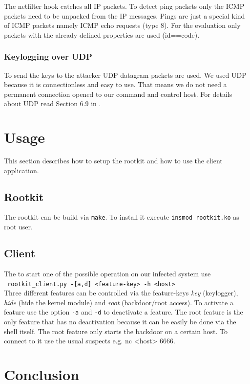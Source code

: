 \documentclass[12pt]{article}
\newcommand{\shellcmd}[1]{\\\indent\indent\texttt{\footnotesize\ #1}\\}
\newcommand{\shellcmdinline}[1]{\texttt{\footnotesize #1}}
\begin{document}
The netfilter hook catches all IP packets. To detect ping packets only the ICMP packets need to be unpacked from the IP messages. Pings are just a special kind of ICMP packets namely ICMP echo requests (type 8).  For the evaluation only packets with the already defined properties are used (id==code).

\subsubsection{Keylogging over UDP}
To send the keys to the attacker UDP datagram packets are used. We used UDP because it is connectionless and easy to use. That means we do not need a permanent connection opened to our command and control host. For details about UDP read Section 6.9 in \cite{rechenberg1997informatik}.

\newpage
\section{Usage}
\label{sec:usage}
This section describes how to setup the rootkit and how to use the client application.

\subsection{Rootkit}
The rootkit can be build via \shellcmdinline{make}. To install it execute \shellcmdinline{insmod rootkit.ko} as root user.

\subsection{Client}
The to start one of the possible operation on our infected system use \shellcmd{rootkit\_client.py~-[a,d]~<feature-key>~-h~<host>} Three different features can be controlled via the feature-keys \emph{key} (keylogger), \emph{hide} (hide the kernel module) and \emph{root} (backdoor/root access). To activate a feature use the option \shellcmdinline{-a} and \shellcmdinline{-d} to deactivate a feature. The root feature is the only feature that has no deactivation because it can be easily be done via the shell itself. The root feature only starts the backdoor on a certain host. To connect to it use the usual suspects e.g. \shellcmdinline\shellcmdinline{nc <host> 6666}.

\newpage
\section{Conclusion}
\end{document}
